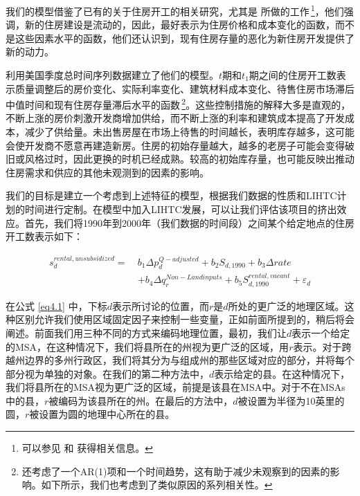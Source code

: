 \documentclass[lang=cn,11pt,a4paper]{paper}
\begin{document}
我们的模型借鉴了已有的关于住房开工的相关研究，尤其是 \cite{Mayer200085} 所做的工作\,\footnote{可以参见 \cite{Topel1988718} 和 \cite{DiPasquale1992337} 获得相关信息。}，他们强调，新的住房建设是流动的，因此，最好表示为住房价格和成本变化的函数，而不是这些因素水平的函数，他们还认识到，现有住房存量的恶化为新住房开发提供了新的动力。

\cite{Mayer200085} 利用美国季度总时间序列数据建立了他们的模型。$t$期和$t_1$期之间的住房开工数表示质量调整后的房价变化、实际利率变化、建筑材料成本变化、待售住房市场滞后中值时间和现有住房存量滞后水平的函数\,\footnote{\cite{Mayer200085} 还考虑了一个AR(1)项和一个时间趋势，这有助于减少未观察到的因素的影响。如下所示，我们也考虑到了类似原因的系列相关性。}。这些控制措施的解释大多是直观的，不断上涨的房价刺激开发商增加供给，而不断上涨的利率和建筑成本提高了开发成本，减少了供给量。未出售房屋在市场上待售的时间越长，表明库存越多，这可能会使开发商不愿意再建造新房。住房的初始存量越大，越多的老房子可能会变得破旧或风格过时，因此更换的时机已经成熟。较高的初始库存量，也可能反映出推动住房需求和供应的其他未观测到的因素的影响。

我们的目标是建立一个考虑到上述特征的模型，根据我们数据的性质和LIHTC计划的时间进行定制。在模型中加入LIHTC发展，可以让我们评估该项目的挤出效应。首先，我们将1990年到2000年（我们数据的时间段）之间某个给定地点的住房开工数表示如下：

\begin{equation}\label{eq4.1}
  \begin{aligned}
  s_{d}^{rental,unsubsidized}=\ & b_{1} \Delta p_{d}^{Q-adjusted}+b_{2} S_{d, 1990}+b_{3} \Delta r a t e \\
  &+b_{4} \Delta q_{r}^{Non-Landinputs}+b_{5} S_{d, 1990}^{rental, vacant}+\varepsilon_{d}
  \end{aligned}
\end{equation}
\vspace{2pt}

在公式 \eqref{eq4.1} 中，下标$d$表示所讨论的位置，而$r$是$d$所处的更广泛的地理区域。这种区别允许我们使用区域固定因子来控制一些变量，正如前面所提到的，稍后将会阐述。前面我们用三种不同的方式来编码地理位置，最初，我们让$d$表示一个给定的MSA，在这种情况下，我们将县所在的州视为更广泛的区域，用$r$表示。对于跨越州边界的多州行政区，我们将其分为与组成州的那些区域对应的部分，并将每个部分视为单独的对象。在我们的第二种方法中，$d$表示给定的县。在这种情况下，我们将县所在的MSA视为更广泛的区域，前提是该县在MSA中。对于不在MSAs中的县，$r$被编码为该县所在的州。在最后的方法中，$d$被设置为半径为10英里的圆，$r$被设置为圆的地理中心所在的县。
\end{document}
